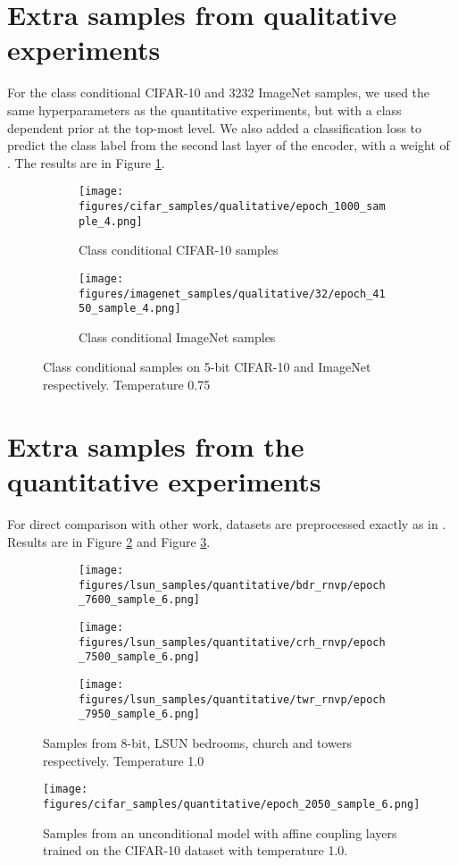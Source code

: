 \documentclass{article}
\begin{document}
\section{Extra samples from qualitative experiments}
For the class conditional CIFAR-10 and 3232 ImageNet samples, we used the same hyperparameters as the quantitative experiments, but with a class dependent prior at the top-most level. We also added a classification loss to predict the class label from the second last layer of the encoder, with a weight of . The results are in Figure \ref{fig:cif_img_qual}.
\begin{figure}[h]
	\centering
	\begin{subfigure}{0.69\textwidth}
    	\texttt{[image: figures/cifar\_samples/qualitative/epoch\_1000\_sample\_4.png]}
	\caption{Class conditional CIFAR-10 samples}
	\end{subfigure}\hspace{0.01\textwidth}\begin{subfigure}{0.69\textwidth}
    	\texttt{[image: figures/imagenet\_samples/qualitative/32/epoch\_4150\_sample\_4.png]}
	\caption{Class conditional  ImageNet samples}
	\end{subfigure}
\caption{Class conditional samples on 5-bit CIFAR-10 and  ImageNet respectively. Temperature 0.75}
\label{fig:cif_img_qual}
\end{figure}

\section{Extra samples from the quantitative experiments}
For direct comparison with other work, datasets are preprocessed exactly as in \cite{dinh2016density}. Results are in Figure \ref{fig:lsun_quant} and Figure \ref{fig:my_label}.
\begin{figure}[h]
	\centering
	\begin{subfigure}{0.49\textwidth}\texttt{[image: figures/lsun\_samples/quantitative/bdr\_rnvp/epoch\_7600\_sample\_6.png]}
	\end{subfigure}\hspace{0.01\textwidth}\begin{subfigure}{0.49\textwidth}\texttt{[image: figures/lsun\_samples/quantitative/crh\_rnvp/epoch\_7500\_sample\_6.png]}
	\end{subfigure}\hspace{0.01\textwidth}\begin{subfigure}{0.49\textwidth}\texttt{[image: figures/lsun\_samples/quantitative/twr\_rnvp/epoch\_7950\_sample\_6.png]}
	\end{subfigure}\caption{Samples from 8-bit,  LSUN bedrooms, church and towers respectively. Temperature 1.0}
\label{fig:lsun_quant}
\end{figure}


\begin{figure}
    \centering
    \texttt{[image: figures/cifar\_samples/quantitative/epoch\_2050\_sample\_6.png]}
    \caption{Samples from an unconditional model with affine coupling layers trained on the CIFAR-10 dataset with temperature 1.0.}
    \label{fig:my_label}
\end{figure}
\end{document}
